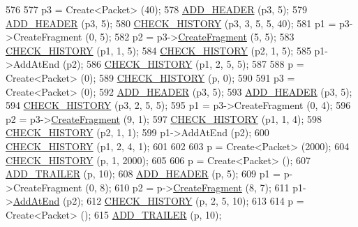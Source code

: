 \begin{DoxyCode}
576 
577   p3 = Create<Packet> (40);
578   \hyperlink{packet-metadata-test_8cc_a120012d48d29d678b3138d5c7b9bf714}{ADD\_HEADER} (p3, 5);
579   \hyperlink{packet-metadata-test_8cc_a120012d48d29d678b3138d5c7b9bf714}{ADD\_HEADER} (p3, 5);
580   \hyperlink{packet-metadata-test_8cc_a15a730e778d9d498a39e778bcd39684c}{CHECK\_HISTORY} (p3, 3, 5, 5, 40);
581   p1 = p3->CreateFragment (0, 5);
582   p2 = p3->\hyperlink{classns3_1_1Packet_a16f6113606b355b2b346e2245fa2a3d0}{CreateFragment} (5, 5);
583   \hyperlink{packet-metadata-test_8cc_a15a730e778d9d498a39e778bcd39684c}{CHECK\_HISTORY} (p1, 1, 5);
584   \hyperlink{packet-metadata-test_8cc_a15a730e778d9d498a39e778bcd39684c}{CHECK\_HISTORY} (p2, 1, 5);
585   p1->AddAtEnd (p2);
586   \hyperlink{packet-metadata-test_8cc_a15a730e778d9d498a39e778bcd39684c}{CHECK\_HISTORY} (p1, 2, 5, 5);
587 
588   p = Create<Packet> (0);
589   \hyperlink{packet-metadata-test_8cc_a15a730e778d9d498a39e778bcd39684c}{CHECK\_HISTORY} (p, 0);
590 
591   p3 = Create<Packet> (0);
592   \hyperlink{packet-metadata-test_8cc_a120012d48d29d678b3138d5c7b9bf714}{ADD\_HEADER} (p3, 5);
593   \hyperlink{packet-metadata-test_8cc_a120012d48d29d678b3138d5c7b9bf714}{ADD\_HEADER} (p3, 5);
594   \hyperlink{packet-metadata-test_8cc_a15a730e778d9d498a39e778bcd39684c}{CHECK\_HISTORY} (p3, 2, 5, 5);
595   p1 = p3->CreateFragment (0, 4);
596   p2 = p3->\hyperlink{classns3_1_1Packet_a16f6113606b355b2b346e2245fa2a3d0}{CreateFragment} (9, 1);
597   \hyperlink{packet-metadata-test_8cc_a15a730e778d9d498a39e778bcd39684c}{CHECK\_HISTORY} (p1, 1, 4);
598   \hyperlink{packet-metadata-test_8cc_a15a730e778d9d498a39e778bcd39684c}{CHECK\_HISTORY} (p2, 1, 1);
599   p1->AddAtEnd (p2);
600   \hyperlink{packet-metadata-test_8cc_a15a730e778d9d498a39e778bcd39684c}{CHECK\_HISTORY} (p1, 2, 4, 1);
601 
602 
603   p = Create<Packet> (2000);
604   \hyperlink{packet-metadata-test_8cc_a15a730e778d9d498a39e778bcd39684c}{CHECK\_HISTORY} (p, 1, 2000);
605 
606   p = Create<Packet> ();
607   \hyperlink{packet-metadata-test_8cc_ab10bc130bb7184d47509ea44f4fb24df}{ADD\_TRAILER} (p, 10);
608   \hyperlink{packet-metadata-test_8cc_a120012d48d29d678b3138d5c7b9bf714}{ADD\_HEADER} (p, 5);
609   p1 = p->CreateFragment (0, 8);
610   p2 = p->\hyperlink{classns3_1_1Packet_a16f6113606b355b2b346e2245fa2a3d0}{CreateFragment} (8, 7);
611   p1->\hyperlink{classns3_1_1Packet_a14ec3d4250b425468764de58f5837b6b}{AddAtEnd} (p2);
612   \hyperlink{packet-metadata-test_8cc_a15a730e778d9d498a39e778bcd39684c}{CHECK\_HISTORY} (p, 2, 5, 10);
613 
614   p = Create<Packet> ();
615   \hyperlink{packet-metadata-test_8cc_ab10bc130bb7184d47509ea44f4fb24df}{ADD\_TRAILER} (p, 10);

\end{DoxyCode}
